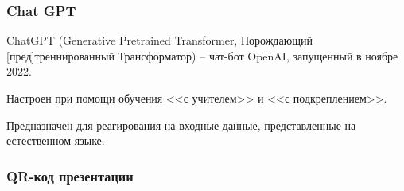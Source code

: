 \documentclass[10pt]{beamer}
\begin{document}
\begin{frame}
  \frametitle{Chat GPT}
  ChatGPT (Generative Pretrained Transformer, Порождающий [пред]треннированный Трансформатор) -- чат-бот OpenAI, запущенный в ноябре 2022.

  Настроен при помощи обучения <<с учителем>> и <<с подкреплением>>.

  Предназначен для реагирования на входные данные, представленные на естественном языке.

\end{frame}

\begin{frame}
  \frametitle{QR-код презентации}
  \centering
\end{frame}
\end{document}
